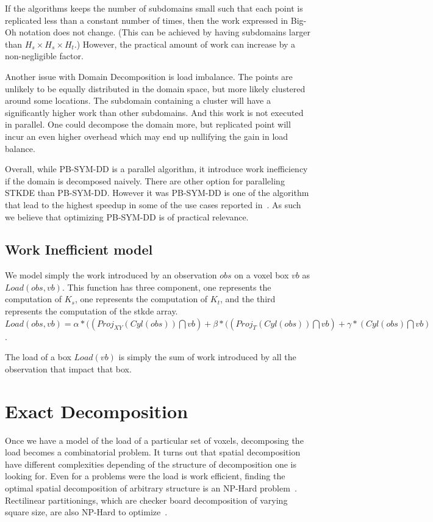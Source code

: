 \documentclass[10pt, conference, compsocconf]{IEEEtran}
\begin{document}
If the algorithms keeps the number of subdomains small such that each
point is replicated less than a constant number of times, then
the work expressed in Big-Oh notation does not change.
(This can be achieved by having subdomains larger than
$H_s \times H_s \times H_t$.) However, the practical amount of work can
increase by a non-negligible factor. 

Another issue with Domain Decomposition is load imbalance. The
points are unlikely to be equally distributed in the domain space, but
more likely clustered around some locations. The subdomain containing
a cluster will have a significantly higher work than other
subdomains. And this work is not executed in parallel. One could
decompose the domain more, but replicated point 
will incur an even higher overhead which may end up nullifying
the gain in load balance.

Overall, while PB-SYM-DD is a parallel algorithm, it introduce work
inefficiency if the domain is decomposed naively. There are other
option for paralleling STKDE than PB-SYM-DD. However it was PB-SYM-DD
is one of the algorithm that lead to the highest speedup in some of
the use cases reported in~\cite{Saule17-ICPP}. As such we believe that
optimizing PB-SYM-DD is of practical relevance.

\subsection{Work Inefficient model}

We model simply the work introduced by an observation $obs$ on a voxel
box $vb$ as $Load(obs, vb)$. This function has three component, one
represents the computation of $K_s$, one represents the computation of
$K_t$, and the third represents the computation of the stkde
array. $Load(obs, vb) = \alpha * ((Proj_{XY}(Cyl(obs)) \bigcap vb) +
\beta * ((Proj_{T}(Cyl(obs)) \bigcap vb) + \gamma * (Cyl(obs) \bigcap vb)$.

The load of a box $Load(vb)$ is simply the sum of work introduced by
all the observation that impact that box.

    
\section{Exact Decomposition}
\label{sec:exactdecomposition}

Once we have a model of the load of a particular set of voxels,
decomposing the load becomes a combinatorial problem. It turns out
that spatial decomposition have different complexities depending of
the structure of decomposition one is looking for. Even for a problems
were the load is work efficient, finding the optimal spatial
decomposition of arbitrary structure is an NP-Hard
problem~\cite{grigni96}. Rectilinear partitionings, which are checker board
decomposition of varying square size, are also NP-Hard to optimize~\cite{grigni96,aspvall98}.
\end{document}
